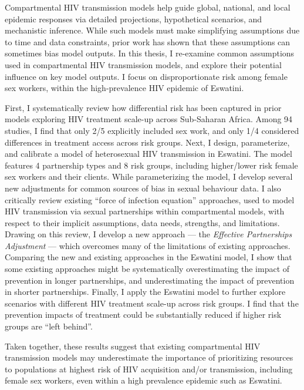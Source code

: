 \par %
Compartmental HIV transmission models help guide global, national, and local epidemic responses
via detailed projections, hypothetical scenarios, and mechanistic inference.
While such models must make simplifying assumptions due to time and data constraints,
prior work has shown that these assumptions can sometimes bias model outputs.
In this thesis, I re-examine common assumptions used in compartmental HIV transmission models,
and explore their potential influence on key model outputs.
I focus on disproportionate risk among female sex workers,
within the high-prevalence HIV epidemic of Eswatini.
\par %
First, I systematically review how differential risk has been captured in
prior models exploring HIV treatment scale-up across Sub-Saharan Africa.
Among 94 studies, I find that only 2/5 explicitly included sex work,
and only 1/4 considered differences in treatment access across risk groups.
Next, I design, parameterize, and calibrate a model of heterosexual HIV transmission in Eswatini.
The model features 4 partnership types and 8 risk groups, including
higher/lower risk female sex workers and their clients.
While parameterizing the model, I develop several new adjustments
for common sources of bias in sexual behaviour data.
I also critically review existing ``force of infection equation'' approaches,
used to model HIV transmission via sexual partnerships within compartmental models,
with respect to their implicit assumptions, data needs, strengths, and limitations.
Drawing on this review, I develop a new approach
--- the \emph{Effective Partnerships Adjustment} ---
which overcomes many of the limitations of existing approaches.
Comparing the new and existing approaches in the Eswatini model,
I show that some existing approaches might be systematically
overestimating the impact of prevention in longer partnerships, and
underestimating the impact of prevention in shorter partnerships.
Finally, I apply the Eswatini model to further explore
scenarios with different HIV treatment scale-up across risk groups.
I find that the prevention impacts of treatment could be substantially reduced
if higher risk groups are ``left behind''.
\par %
Taken together, these results suggest that existing compartmental HIV transmission models
may underestimate the importance of prioritizing resources to
populations at highest risk of HIV acquisition and/or transmission,
including female sex workers, even within a high prevalence epidemic such as Eswatini.
